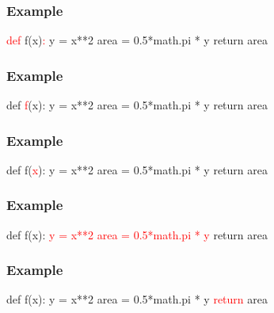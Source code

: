 \documentclass[11pt]{beamer}
\begin{document}
\begin{frame}[fragile]
  \frametitle{Example}
  \Enlarge

 
  \begin{semiverbatim} 
\textcolor{red}{def} f(x)\textcolor{red}{:}
    y = x**2 
    area = 0.5*math.pi * y 
    return area
  \end{semiverbatim}

\end{frame}

\begin{frame}[fragile]
  \frametitle{Example}
  \Enlarge

 
  \begin{semiverbatim} 
def \textcolor{red}{f}(x):
    y = x**2 
    area = 0.5*math.pi * y
    return area
  \end{semiverbatim}

\end{frame}

\begin{frame}[fragile]
  \frametitle{Example}
  \Enlarge

 
  \begin{semiverbatim} 
def f(\textcolor{red}{x}):
    y = x**2 
    area = 0.5*math.pi * y
    return area
  \end{semiverbatim}

\end{frame}

\begin{frame}[fragile]
  \frametitle{Example}
  \Enlarge

 
  \begin{semiverbatim} 
def f(x):
    \textcolor{red}{y = x**2} 
    \textcolor{red}{area = 0.5*math.pi * y} 
    return area
  \end{semiverbatim}

\end{frame}

\begin{frame}[fragile]
  \frametitle{Example}
  \Enlarge

 
  \begin{semiverbatim} 
def f(x):
    y = x**2
    area = 0.5*math.pi * y
    \textcolor{red}{return} \textcolor{CS101PureBase}{area}
  \end{semiverbatim}

\end{frame}
\end{document}
